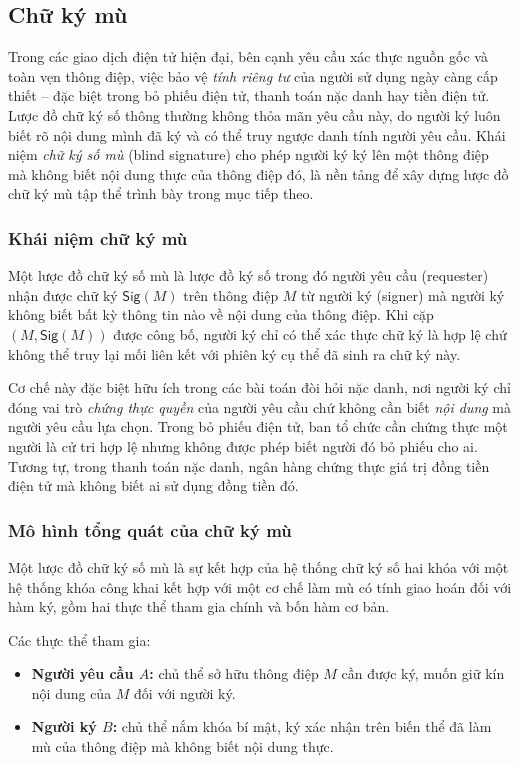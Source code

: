 \subsection{Chữ ký mù}
\label{sec:chu-ky-mu}

Trong các giao dịch điện tử hiện đại, bên cạnh yêu cầu xác thực nguồn gốc và toàn vẹn thông điệp, việc bảo vệ \textit{tính riêng tư} của người sử dụng ngày càng cấp thiết -- đặc biệt trong bỏ phiếu điện tử, thanh toán nặc danh hay tiền điện tử. Lược đồ chữ ký số thông thường không thỏa mãn yêu cầu này, do người ký luôn biết rõ nội dung mình đã ký và có thể truy ngược danh tính người yêu cầu. Khái niệm \textit{chữ ký số mù} (blind signature) cho phép người ký ký lên một thông điệp mà không biết nội dung thực của thông điệp đó, là nền tảng để xây dựng lược đồ chữ ký mù tập thể trình bày trong mục tiếp theo.

\subsubsection{Khái niệm chữ ký mù}

Một lược đồ chữ ký số mù là lược đồ ký số trong đó người yêu cầu (requester) nhận được chữ ký $\textsf{Sig}(M)$ trên thông điệp $M$ từ người ký (signer) mà người ký không biết bất kỳ thông tin nào về nội dung của thông điệp. Khi cặp $(M, \textsf{Sig}(M))$ được công bố, người ký chỉ có thể xác thực chữ ký là hợp lệ chứ không thể truy lại mối liên kết với phiên ký cụ thể đã sinh ra chữ ký này.

Cơ chế này đặc biệt hữu ích trong các bài toán đòi hỏi nặc danh, nơi người ký chỉ đóng vai trò \textit{chứng thực quyền} của người yêu cầu chứ không cần biết \textit{nội dung} mà người yêu cầu lựa chọn. Trong bỏ phiếu điện tử, ban tổ chức cần chứng thực một người là cử tri hợp lệ nhưng không được phép biết người đó bỏ phiếu cho ai. Tương tự, trong thanh toán nặc danh, ngân hàng chứng thực giá trị đồng tiền điện tử mà không biết ai sử dụng đồng tiền đó.

\subsubsection{Mô hình tổng quát của chữ ký mù}

Một lược đồ chữ ký số mù là sự kết hợp của hệ thống chữ ký số hai khóa với một hệ thống khóa công khai kết hợp với một cơ chế làm mù có tính giao hoán đối với hàm ký, gồm hai thực thể tham gia chính và bốn hàm cơ bản.

Các thực thể tham gia:
\begin{itemize}
    \item \textbf{Người yêu cầu $A$:} chủ thể sở hữu thông điệp $M$ cần được ký, muốn giữ kín nội dung của $M$ đối với người ký.
    \item \textbf{Người ký $B$:} chủ thể nắm khóa bí mật, ký xác nhận trên biến thể đã làm mù của thông điệp mà không biết nội dung thực.
\end{itemize}

